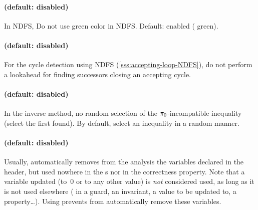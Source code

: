\paragraph{ (default: disabled)}
In NDFS, Do not use green color in NDFS. Default: enabled (\ie{} green).

\paragraph{ (default: disabled)}
For the cycle detection using NDFS (\cref{sss:accepting-loop-NDFS}),
do not perform a lookahead for finding successors
closing an accepting cycle.


\paragraph{ (default: disabled)}
In the inverse method, no random selection of the $\pi_0$-incompatible inequality (select the first found).
By default, select an inequality in a random manner.



\paragraph{ (default: disabled)}
Usually, \imitator{} automatically removes from the analysis the variables declared in the header, but used nowhere in the \IPTA{}s nor in the correctness property.
Note that a variable updated (to~0 or to any other value) is \emph{not} considered used, as long as it is not used elsewhere (\ie{} in a guard, an invariant, a value to be updated to, a property…).
Using  prevents \imitator{} from automatically remove these variables.


